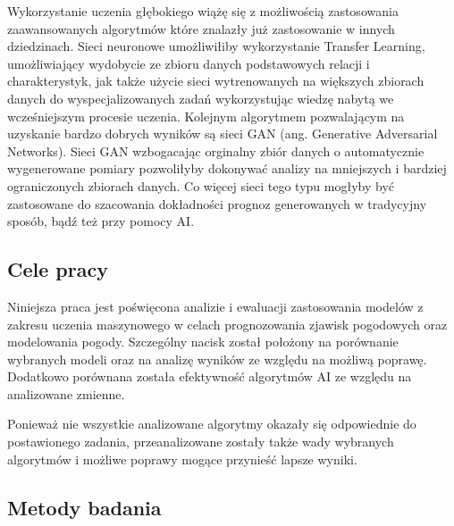 Wykorzystanie uczenia głębokiego wiążę się z możliwością zastosowania 
zaawansowanych algorytmów które znalazły już zastosowanie w innych dziedzinach.
Sieci neuronowe umożliwiłiby wykorzystanie Transfer Learning, umożliwiający
wydobycie ze zbioru danych podstawowych relacji i charakterystyk, jak także
użycie sieci wytrenowanych na większych zbiorach danych do wyspecjalizowanych
zadań wykorzystując wiedzę nabytą we wcześniejszym procesie uczenia. Kolejnym 
algorytmem pozwalającym na uzyskanie bardzo dobrych wyników są sieci GAN (ang. 
Generative Adversarial Networks). Sieci GAN wzbogacając orginalny zbiór danych o
automatycznie wygenerowane pomiary pozwoliłyby dokonywać analizy na mniejszych i 
bardziej ograniczonych zbiorach danych. Co więcej sieci tego typu mogłyby
być zastosowane do szacowania dokładności prognoz generowanych w tradycyjny sposób,
bądź też przy pomocy AI.


\subsection{Cele pracy}


Niniejsza praca jest poświęcona analizie i ewaluacji zastosowania modelów 
z zakresu uczenia maszynowego w celach prognozowania zjawisk pogodowych oraz
modelowania pogody. Szczególny nacisk został położony na porównanie wybranych
modeli oraz na analizę wyników ze względu na możliwą poprawę. Dodatkowo 
porównana została efektywność algorytmów AI ze względu na analizowane zmienne.

Ponieważ nie wszystkie analizowane algorytmy okazały się odpowiednie do postawionego
zadania, przeanalizowane zostały także wady wybranych algorytmów i możliwe poprawy
mogące przynieść lapsze wyniki.

\subsection{Metody badania}

